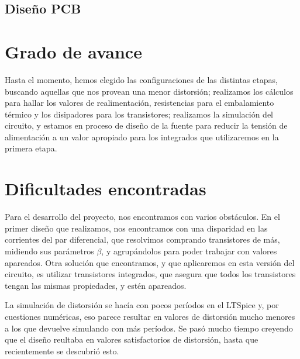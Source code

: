 \documentclass[a4paper,12pt,twoside]{article}
\begin{document}











\subsection{Diseño PCB}


\section{Grado de avance}

Hasta el momento, hemos elegido las configuraciones de las distintas etapas, buscando aquellas que nos provean una menor distorsión; realizamos los cálculos para hallar los valores de realimentación, resistencias para el embalamiento térmico y los disipadores para los transistores; realizamos la simulación del circuito, y estamos en proceso de diseño de la fuente para reducir la tensión de alimentación a un valor apropiado para los integrados que utilizaremos en la primera etapa. 

\section{Dificultades encontradas}

Para el desarrollo del proyecto, nos encontramos con varios obstáculos. En el primer diseño que realizamos, nos encontramos con una disparidad en las corrientes del par diferencial, que resolvimos comprando transistores de más, midiendo sus parámetros $\beta$, y agrupándolos para poder trabajar con valores apareados. Otra solución que encontramos, y que aplicaremos en esta versión del circuito, es utilizar transistores integrados, que asegura que todos los transistores tengan las mismas propiedades, y estén apareados.

La simulación de distorsión se hacía con pocos períodos en el LTSpice y, por cuestiones numéricas, eso parece resultar en valores de distorsión mucho menores a los que devuelve simulando con más períodos. Se pasó mucho tiempo creyendo que el diseño reultaba en valores satisfactorios de distorsión, hasta que recientemente se descubrió esto.
\end{document}
